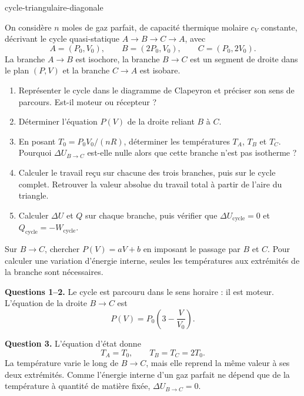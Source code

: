 \begin{exo}{cycle-triangulaire-diagonale}

On considère $n$ moles de gaz parfait, de capacité thermique molaire $c_V$
constante, décrivant le cycle quasi-statique $A\to B\to C\to A$, avec
\[
A=(P_0,V_0),
\qquad
B=(2P_0,V_0),
\qquad
C=(P_0,2V_0).
\]
La branche $A\to B$ est isochore, la branche $B\to C$ est un segment de droite
dans le plan $(P,V)$ et la branche $C\to A$ est isobare.

\begin{enumerate}
\item Représenter le cycle dans le diagramme de Clapeyron et préciser son sens
de parcours. Est-il moteur ou récepteur ?
\item Déterminer l'équation $P(V)$ de la droite reliant $B$ à $C$.
\item En posant $T_0=P_0V_0/(nR)$, déterminer les températures $T_A$, $T_B$ et
$T_C$. Pourquoi $\Delta U_{B\to C}$ est-elle nulle alors que cette branche
n'est pas isotherme ?
\item Calculer le travail reçu sur chacune des trois branches, puis sur le cycle
complet. Retrouver la valeur absolue du travail total à partir de l'aire du
triangle.
\item Calculer $\Delta U$ et $Q$ sur chaque branche, puis vérifier que
$\Delta U_{\mathrm{cycle}}=0$ et $Q_{\mathrm{cycle}}=-W_{\mathrm{cycle}}$.
\end{enumerate}

\begin{indication}
Sur $B\to C$, chercher $P(V)=aV+b$ en imposant le passage par $B$ et $C$.
Pour calculer une variation d'énergie interne, seules les températures aux
extrémités de la branche sont nécessaires.
\end{indication}

\begin{solution}
\textbf{Questions 1--2.} Le cycle est parcouru dans le sens horaire : il est
moteur. L'équation de la droite $B\to C$ est
\[
P(V)=P_0\left(3-\frac{V}{V_0}\right).
\]

\textbf{Question 3.} L'équation d'état donne
\[
T_A=T_0,
\qquad
T_B=T_C=2T_0.
\]
La température varie le long de $B\to C$, mais elle reprend la même valeur à
ses deux extrémités. Comme l'énergie interne d'un gaz parfait ne dépend que de
la température à quantité de matière fixée, $\Delta U_{B\to C}=0$.


\end{solution}
\end{exo}
